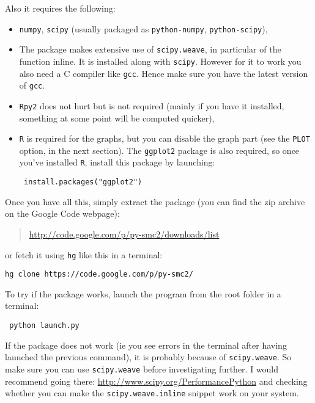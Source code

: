 \documentclass[a4paper,10pt]{paper}
\begin{document}
Also it requires the following:
\begin{itemize}
 \item \texttt{numpy}, \texttt{scipy} (usually packaged as \texttt{python-numpy}, \texttt{python-scipy}),
 \item The package makes extensive use of \texttt{scipy.weave}, in particular of the function inline. It is installed along with \texttt{scipy}. However for it to work you also 
need a C compiler like \texttt{gcc}. Hence make sure you have the latest version of \texttt{gcc}.
 \item \texttt{Rpy2} does not hurt but is not required (mainly if you have it installed, something at some point will be computed quicker),
 \item \texttt{R} is required for the graphs, but you can disable the graph part (see the \texttt{PLOT} option, in the next section). 
The \texttt{ggplot2} package is also required, so once you've installed \texttt{R}, install this package by launching:
\begin{lstlisting}
 install.packages("ggplot2")
\end{lstlisting}
\end{itemize}

Once you have all this, simply extract the package (you can find the zip archive on the Google Code webpage):
\begin{quote}
 \href{http://code.google.com/p/py-smc2/downloads/list}{http://code.google.com/p/py-smc2/downloads/list}
\end{quote}

or fetch it using \texttt{hg} like this in a terminal:
\begin{lstlisting}
hg clone https://code.google.com/p/py-smc2/
\end{lstlisting}

To try if the package works, launch the program from the root folder in a terminal:
\begin{center}
 \begin{lstlisting}
 python launch.py
\end{lstlisting}
\end{center}

If the package does not work (ie you see errors in the terminal after having launched the previous command), it is probably because of \texttt{scipy.weave}. So make sure you can use \texttt{scipy.weave} before 
investigating further. I would recommend going there:
\href{http://www.scipy.org/PerformancePython}{http://www.scipy.org/PerformancePython}
and checking whether you can make the \texttt{scipy.weave.inline} snippet work on your system.
\end{document}
